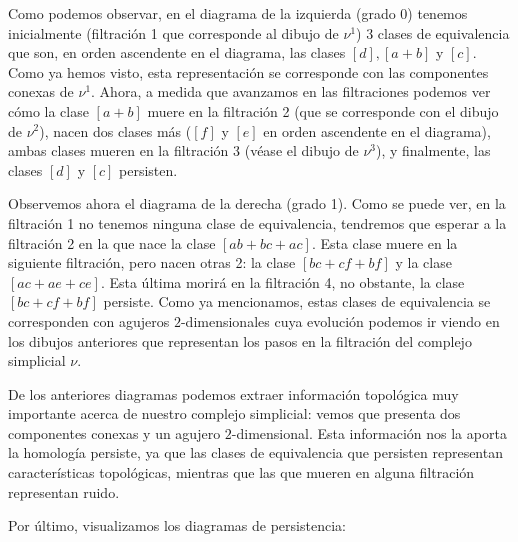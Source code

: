 \documentclass[12pt, a4paper, twoside]{book}
\numberwithin{equation}{section}
\theoremstyle{definition}
\newenvironment{ejem}
  {\pushQED{\qed}\renewcommand{\qedsymbol}{$\blacktriangleleft$}\ejemplo}
  {\popQED\endejemplo}
\theoremstyle{remark}
\theoremstyle{plain}
\begin{document}
\begin{ejem}
\begin{figure}[H]
{\begin{figure}[H]
{}
			\end{figure}	
		\endminipage}
	\end{figure}

	Como podemos observar, en el diagrama de la izquierda (grado 0) 
	tenemos inicialmente (filtración 1 que corresponde al dibujo de 
	{\Large $\nu$}$^{1}$) 3 clases de equivalencia que son, en orden 
	ascendente 
	en el diagrama, las clases $[d],[a+b]$ y $[c]$. Como ya hemos visto, 
	esta representación se corresponde con las componentes conexas de 
	{\Large $\nu$}$^{1}$. Ahora, a medida que avanzamos en las 
	filtraciones podemos ver cómo la clase $[a+b]$ muere en la filtración 2
	(que se corresponde con el dibujo de {\Large $\nu$}$^{2}$), nacen dos 
	clases más ($[f]$ y $[e]$ en orden ascendente en el diagrama), ambas 
	clases mueren en la filtración 3 (véase el dibujo de 
	{\Large $\nu$}$^{3}$), y finalmente, las clases $[d]$ y $[c]$ 
	persisten.
	
	Observemos ahora el diagrama de la derecha (grado 1). Como se puede 
	ver, en la filtración 1 no tenemos ninguna clase de equivalencia, 
	tendremos que esperar a la filtración 2 en la que nace la clase 
	$[ab+bc+ac]$. Esta clase muere en la siguiente filtración, pero nacen 
	otras 2: la clase $[bc+cf+bf]$ y la clase $[ac+ae+ce]$. Esta última 
	morirá en la filtración 4, no obstante, la clase $[bc+cf+bf]$ 
	persiste. Como ya mencionamos, estas clases de equivalencia se 
	corresponden con agujeros $2$-dimensionales cuya evolución podemos ir
	viendo en los dibujos anteriores que representan los pasos en la 
	filtración del complejo simplicial {\Large $\nu$}.

	De los anteriores diagramas podemos extraer información topológica 
	muy importante acerca de nuestro complejo simplicial: vemos que 
	presenta dos componentes conexas y un agujero $2$-dimensional. Esta 
	información nos la aporta la homología persiste, ya que las clases de 
	equivalencia que persisten representan características topológicas, 
	mientras que las que mueren en alguna filtración representan ruido.

	Por último, visualizamos los diagramas de persistencia:
	\begin{figure}[H]
\end{figure}
\end{ejem}
\end{document}
